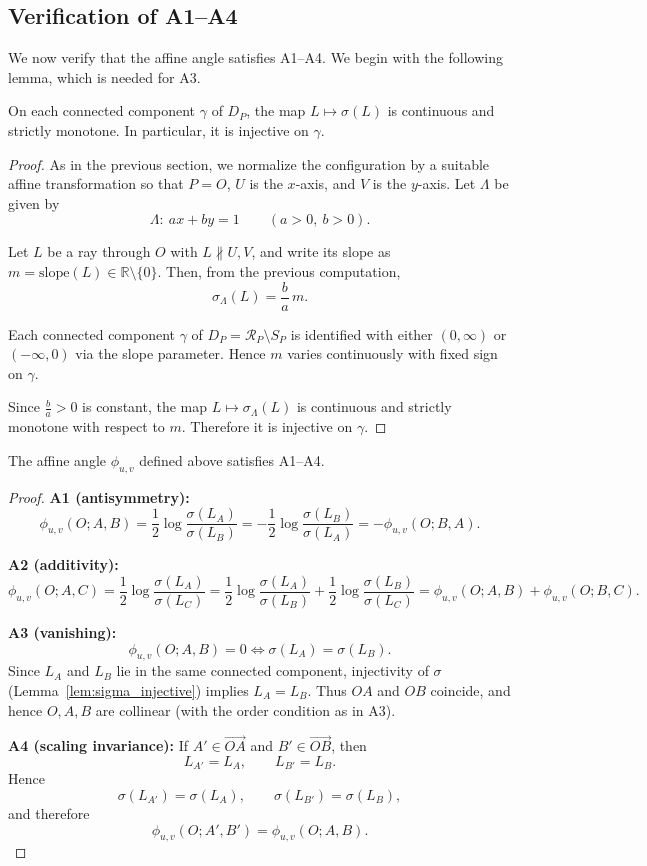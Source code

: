 \documentclass[12pt]{article}
\begin{document}
\subsection{Verification of A1--A4}

We now verify that the affine angle satisfies A1--A4.
We begin with the following lemma, which is needed for A3.

\begin{lemma}\label{lem:sigma_injective}
On each connected component $\gamma$ of $D_P$,
the map $L\mapsto\sigma(L)$ is continuous and strictly monotone.
In particular, it is injective on $\gamma$.
\end{lemma}

\begin{proof}
As in the previous section, we normalize the configuration
by a suitable affine transformation so that $P=O$,
$U$ is the $x$-axis, and $V$ is the $y$-axis.
Let $\Lambda$ be given by
\[
\Lambda:\ ax+by=1 \qquad (a>0,\ b>0).
\]

Let $L$ be a ray through $O$ with $L\not\parallel U,V$,
and write its slope as $m=\mathrm{slope}(L)\in\mathbb{R}\setminus\{0\}$.
Then, from the previous computation,
\[
\sigma_\Lambda(L)=\frac{b}{a}\,m.
\]

Each connected component $\gamma$ of $D_P=\mathcal R_P\setminus S_P$
is identified with either $(0,\infty)$ or $(-\infty,0)$
via the slope parameter.
Hence $m$ varies continuously with fixed sign on $\gamma$.

Since $\frac{b}{a}>0$ is constant,
the map $L\mapsto\sigma_\Lambda(L)$ is continuous
and strictly monotone with respect to $m$.
Therefore it is injective on $\gamma$.
\end{proof}

\begin{proposition}[Satisfaction of A1--A4]
The affine angle $\phi_{u,v}$ defined above satisfies A1--A4.
\end{proposition}

\begin{proof}
\textbf{A1 (antisymmetry):}
\[
\phi_{u,v}(O;A,B)
=
\frac{1}{2}\log\frac{\sigma(L_A)}{\sigma(L_B)}
=
-\frac{1}{2}\log\frac{\sigma(L_B)}{\sigma(L_A)}
=
-\phi_{u,v}(O;B,A).
\]

\smallskip
\textbf{A2 (additivity):}
\[
\phi_{u,v}(O;A,C)
=
\frac{1}{2}\log\frac{\sigma(L_A)}{\sigma(L_C)}
=
\frac{1}{2}\log\frac{\sigma(L_A)}{\sigma(L_B)}
+
\frac{1}{2}\log\frac{\sigma(L_B)}{\sigma(L_C)}
=
\phi_{u,v}(O;A,B)+\phi_{u,v}(O;B,C).
\]

\smallskip
\textbf{A3 (vanishing):}
\[
\phi_{u,v}(O;A,B)=0 \iff \sigma(L_A)=\sigma(L_B).
\]
Since $L_A$ and $L_B$ lie in the same connected component,
injectivity of $\sigma$ (Lemma~\ref{lem:sigma_injective})
implies $L_A=L_B$.
Thus $OA$ and $OB$ coincide, and hence $O,A,B$ are collinear
(with the order condition as in A3).

\smallskip
\textbf{A4 (scaling invariance):}
If $A'\in\overrightarrow{OA}$ and $B'\in\overrightarrow{OB}$,
then
\[
L_{A'}=L_A,\qquad L_{B'}=L_B.
\]
Hence
\[
\sigma(L_{A'})=\sigma(L_A),\qquad
\sigma(L_{B'})=\sigma(L_B),
\]
and therefore
\[
\phi_{u,v}(O;A',B')=\phi_{u,v}(O;A,B).
\]
\end{proof}
\end{document}
